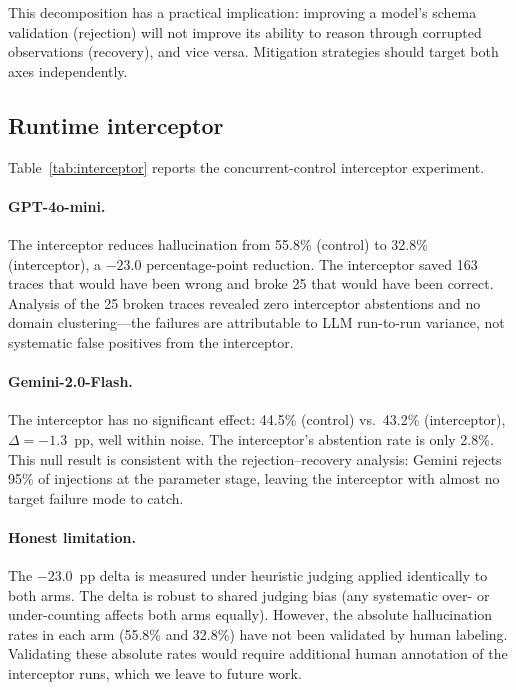 \documentclass[11pt]{article}
\begin{document}
This decomposition has a practical implication: improving a model's
schema validation (rejection) will not improve its ability to reason
through corrupted observations (recovery), and vice versa.
Mitigation strategies should target both axes independently.

\subsection{Runtime interceptor}
\label{sec:interceptor}

Table~\ref{tab:interceptor} reports the concurrent-control interceptor
experiment.



\paragraph{GPT-4o-mini.}
The interceptor reduces hallucination from 55.8\% (control) to 32.8\%
(interceptor), a $-23.0$ percentage-point reduction.
The interceptor saved 163 traces that would have been wrong and broke
25 that would have been correct.
Analysis of the 25 broken traces revealed zero interceptor abstentions
and no domain clustering---the failures are attributable to LLM
run-to-run variance, not systematic false positives from the
interceptor.

\paragraph{Gemini-2.0-Flash.}
The interceptor has no significant effect: 44.5\% (control) vs.\
43.2\% (interceptor), $\Delta{=}{-}1.3$~pp, well within noise.
The interceptor's abstention rate is only 2.8\%.
This null result is consistent with the rejection--recovery analysis:
Gemini rejects 95\% of injections at the parameter stage, leaving the
interceptor with almost no target failure mode to catch.

\paragraph{Honest limitation.}
The $-23.0$~pp delta is measured under heuristic judging applied
identically to both arms.
The delta is robust to shared judging bias (any systematic over- or
under-counting affects both arms equally).
However, the absolute hallucination rates in each arm (55.8\% and
32.8\%) have not been validated by human labeling.
Validating these absolute rates would require additional human
annotation of the interceptor runs, which we leave to future work.
\end{document}
